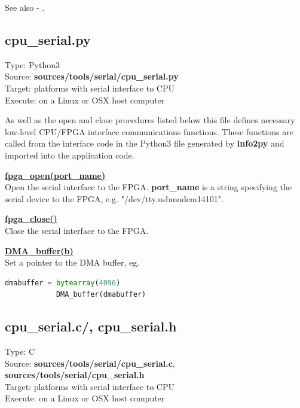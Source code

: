         See also - .
                
        
        \subsection{cpu\_serial.py}\label{ch:tools_python_serial}
    
            Type: Python3\\
            Source: {\bf sources/tools/serial/cpu\_serial.py}\\
            Target: platforms with serial interface to CPU\\
            Execute: on a Linux or OSX host computer
            
            As well as the open and close procedures listed below this file
            defines necessary low-level CPU/FPGA interface communications functions.
            These functions are called from the interface code in the Python3 file
            generated by {\bf info2py} and imported into the application code.
            
            \underline{{\bf fpga\_open(port\_name)}} \\
            Open the serial interface to the FPGA. {\bf port\_name} is a string
            specifying the serial device to the FPGA, e.g.
            "/dev/tty.usbmodem14101".
            
            \underline{{\bf fpga\_close()}} \\
            Close the serial interface to the FPGA.
            
            \underline{{\bf DMA\_buffer(b)}} \\
            Set a pointer to the DMA buffer, eg.
            
            \begin{lstlisting}[gobble=4, language=Python]
            dmabuffer = bytearray(4096)
            DMA_buffer(dmabuffer)
            \end{lstlisting}

            
                
        \subsection{cpu\_serial.c/, cpu\_serial.h}\label{ch:tools_c_serial}
    
            Type: C\\
            Source: {\bf sources/tools/serial/cpu\_serial.c}, {\bf sources/tools/serial/cpu\_serial.h} \\
            Target: platforms with serial interface to CPU\\
            Execute: on a Linux or OSX host computer
        
